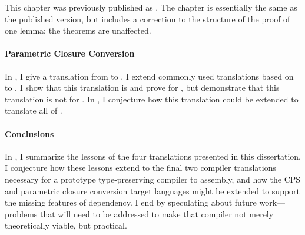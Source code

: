 This chapter was previously published as \citet{bowman2018:cps-sigma}.
The chapter is essentially the same as the published version, but includes a
correction to the structure of the proof of one lemma; the theorems are
unaffected.

\paragraph{Parametric Closure Conversion}
In , I give a   translation from \pccslang to \pcctlang.
I extend commonly used  translations based on
\emph{} to .
I show that this translation is  and prove  for \cpsslang, but demonstrate that this translation is not
 for \slang.
In , I conjecture how this translation could be
extended to translate all of \slang.

\paragraph{Conclusions}
In , I summarize the lessons of the four translations
presented in this dissertation.
I conjecture how these lessons extend to the final two compiler translations
necessary for a prototype type-preserving compiler to assembly, and how the CPS
and parametric closure conversion target languages might be extended to support
the missing features of dependency.
I end by speculating about future work---problems that will need to be addressed
to make that compiler not merely theoretically viable, but practical.
